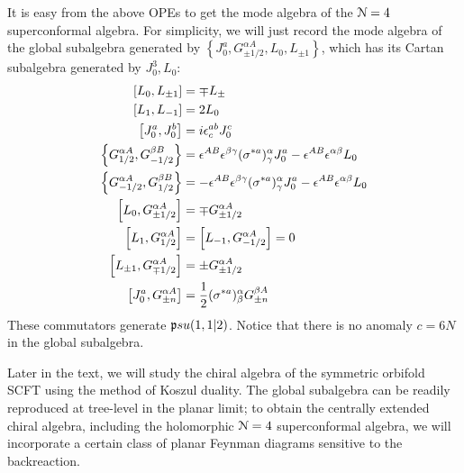 \documentclass[../main.tex]{subfiles}
\begin{document}
 It is easy from the above OPEs to get the mode algebra of the $\mathcal N=4$ superconformal algebra. For simplicity, we will just record the mode algebra of the global subalgebra generated by $\left\lbrace J_0^a, G^{\alpha A}_{\pm 1/2}, L_0, L_{\pm 1} \right\rbrace$, which has its Cartan subalgebra generated by $J_0^3, L_0$: 
 \begin{align}
 \left[L_0, L_{\pm 1} \right]&= \mp L_{\pm}\\
 \left[L_1, L_{-1}\right] &= 2 L_0 \\
 \left[J^a_0, J^b_0 \right]&= i \epsilon^{a b}_c J^c_0 \\
 \left\lbrace  G^{\alpha A}_{1/2}, G^{\beta B}_{-1/2}\right\rbrace &= \epsilon^{AB}\epsilon^{\beta\gamma}(\sigma^{*a})^{\alpha}_{\gamma}J^a_0 -\epsilon^{AB}\epsilon^{\alpha \beta}L_0 \\
 \left\lbrace  G^{\alpha A}_{-1/2}, G^{\beta B}_{1/2}\right\rbrace &= -\epsilon^{AB}\epsilon^{\beta\gamma}(\sigma^{*a})^{\alpha}_{\gamma}J^a_0 -\epsilon^{AB}\epsilon^{\alpha \beta}L_0 \\
 \left[L_0, G^{\alpha A}_{\pm 1/2} \right]&= \mp G^{\alpha A}_{\pm 1/2}\\
 \left[L_1, G^{\alpha A}_{1/2}\right]&= \left[L_{-1}, G^{\alpha A}_{-1/2} \right] = 0 \\
 \left[L_{\pm1}, G^{\alpha A}_{\mp 1/2} \right]&= \pm G^{\alpha A}_{\pm 1/2} \\
 \left[J^a_{0}, G^{\alpha A}_{\pm n} \right]&= {1 \over 2}(\sigma^{*a})^{\alpha}_{\beta}G^{\beta A}_{\pm n} 
 \end{align} These commutators generate $\mathfrak psu(1,1|2)$. Notice that there is no anomaly $c = 6 N$ in the global subalgebra. 
 
 Later in the text, we will study the chiral algebra of the symmetric orbifold SCFT using the method of Koszul duality. The global subalgebra can be readily reproduced at tree-level in the planar limit; to obtain the centrally extended chiral algebra, including the holomorphic $\mathcal{N}=4$ superconformal algebra, we will incorporate a certain class of planar Feynman diagrams sensitive to the backreaction. 
 
\end{document}
